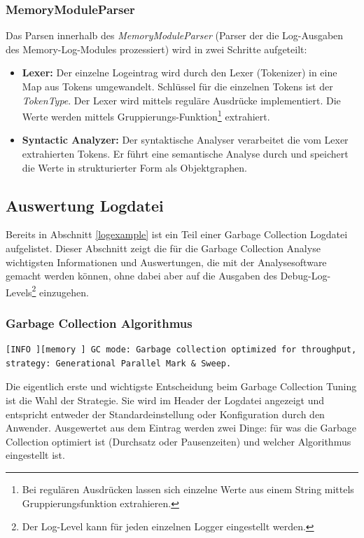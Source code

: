 \subsubsection{MemoryModuleParser}
Das Parsen innerhalb des \textit{MemoryModuleParser} (Parser der die Log-Ausgaben des Memory-Log-Modules prozessiert) wird in zwei Schritte aufgeteilt:
\begin{itemize}
\item \textbf{Lexer: }Der einzelne Logeintrag wird durch den Lexer (Tokenizer) in eine Map aus Tokens umgewandelt. Schlüssel für die einzelnen Tokens ist der \textit{TokenType}. Der Lexer wird mittels reguläre Ausdrücke implementiert. Die Werte werden mittels Gruppierungs-Funktion\footnote{Bei regulären Ausdrücken lassen sich einzelne Werte aus einem String mittels Gruppierungsfunktion extrahieren.} extrahiert. 
\item \textbf{Syntactic Analyzer: }Der syntaktische Analyser verarbeitet die vom Lexer extrahierten Tokens. Er führt eine semantische Analyse durch und speichert die Werte in strukturierter Form als Objektgraphen.
\end{itemize}

\subsection{Auswertung Logdatei}
Bereits in Abschnitt \ref{logexample} ist ein Teil einer Garbage Collection Logdatei aufgelistet. Dieser Abschnitt zeigt die für die Garbage Collection Analyse wichtigsten Informationen und Auswertungen, die mit der Analysesoftware gemacht werden können, ohne dabei aber auf die Ausgaben des Debug-Log-Levels\footnote{Der Log-Level kann für jeden einzelnen Logger eingestellt werden.} einzugehen.

\subsubsection{Garbage Collection Algorithmus}
\begin{lstlisting}[numbers=none,  framexleftmargin=0mm, caption=Logdatei: Ausgabe initialer Garbage Collection Algorithmus]
[INFO ][memory ] GC mode: Garbage collection optimized for throughput, strategy: Generational Parallel Mark & Sweep.
\end{lstlisting}
Die eigentlich erste und wichtigste Entscheidung beim Garbage Collection Tuning ist die Wahl der Strategie. Sie wird im Header der Logdatei angezeigt und entspricht entweder der Standardeinstellung oder Konfiguration durch den Anwender. Ausgewertet aus dem Eintrag werden zwei Dinge: für was die Garbage Collection optimiert ist (Durchsatz oder Pausenzeiten) und welcher Algorithmus eingestellt ist.
	

